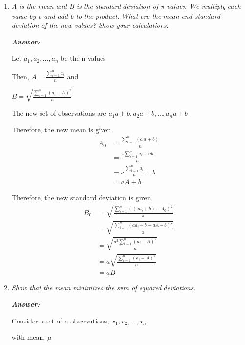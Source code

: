 \documentclass[12pt,letterpaper]{article}
\begin{document}
\begin{enumerate}[label=\textbf{Q\arabic*}, itemsep=30pt]
  \item \textit{A is the mean and B is the standard deviation of n values. We multiply each value by a and add b to the product. What are the mean and standard deviation of the new values? Show your calculations.}

  \textbf{\textit{Answer: }}
  
  Let $a_1, a_2, \ldots, a_n$ be the n values

  Then, $A = \frac{\sum_{i=1}^{n} a_i}{n}$ and
  
  $B = \sqrt{\frac{\sum_{i=1}^{n} (a_i - A)^2}{n}}$

  The new set of observations are $a_1a + b, a_2a + b, \ldots, a_na + b$

  Therefore, the new mean is given
  \begin{align*}
    A_0 &= \frac{\sum_{i=1}^{n} (a_ia + b)}{n} \\
    &= \frac{a\sum_{i=1}^{n} a_i + nb}{n} \\
    &= a\frac{\sum_{i=1}^{n} a_i}{n} + b \\
    &= aA + b
  \end{align*}
  
  Therefore, the new standard deviation is given
  \begin{align*}
    B_0 &= \sqrt{\frac{\sum_{i=1}^{n} ((aa_i + b) - A_0)^2}{n}} \\
    &= \sqrt{\frac{\sum_{i=1}^{n} (aa_i + b - aA - b)^2}{n}} \\
    &= \sqrt{\frac{a^2\sum_{i=1}^{n} (a_i - A)^2}{n}} \\
    &= a\sqrt{\frac{\sum_{i=1}^{n} (a_i - A)^2}{n}} \\
    &= aB
  \end{align*}

  \newpage
  \item \textit{Show that the mean minimizes the sum of squared deviations.}
  
  \textbf{\textit{Answer: }}

  Consider a set of n observations, $x_1, x_2, \ldots, x_n$

  with mean, $\mu$


\end{enumerate}
\end{document}
